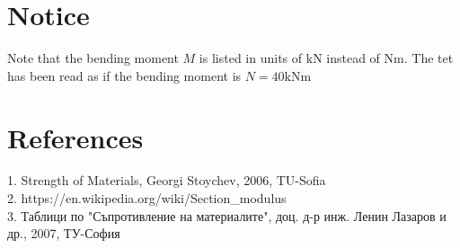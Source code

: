 \documentclass{article}
\begin{document}
\section{Notice}
Note that the bending moment $M$ is listed in units of $\si{\kilo \newton}$ instead of $\si{\newton\meter}$.
The tet has been read as if the bending moment is $N = 40 \si{\kilo\newton\meter}$

\section{References}
1. Strength of Materials, Georgi Stoychev, 2006, TU-Sofia \\
2. https://en.wikipedia.org/wiki/Section\_modulus \\
3. Таблици по "Съпротивление на материалите", доц. д-р инж. Ленин Лазаров и др., 2007, ТУ-София
\end{document}
